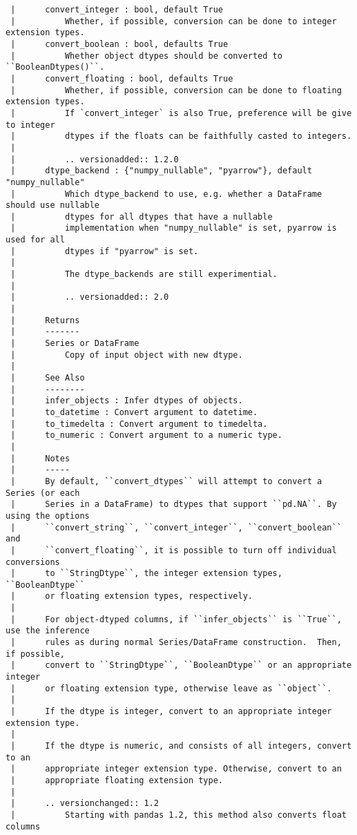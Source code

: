 \documentclass[
  letterpaper,
  DIV=11,
  numbers=noendperiod]{scrreprt}
\begin{document}
\begin{verbatim}
 |      convert_integer : bool, default True
 |          Whether, if possible, conversion can be done to integer extension types.
 |      convert_boolean : bool, defaults True
 |          Whether object dtypes should be converted to ``BooleanDtypes()``.
 |      convert_floating : bool, defaults True
 |          Whether, if possible, conversion can be done to floating extension types.
 |          If `convert_integer` is also True, preference will be give to integer
 |          dtypes if the floats can be faithfully casted to integers.
 |      
 |          .. versionadded:: 1.2.0
 |      dtype_backend : {"numpy_nullable", "pyarrow"}, default "numpy_nullable"
 |          Which dtype_backend to use, e.g. whether a DataFrame should use nullable
 |          dtypes for all dtypes that have a nullable
 |          implementation when "numpy_nullable" is set, pyarrow is used for all
 |          dtypes if "pyarrow" is set.
 |      
 |          The dtype_backends are still experimential.
 |      
 |          .. versionadded:: 2.0
 |      
 |      Returns
 |      -------
 |      Series or DataFrame
 |          Copy of input object with new dtype.
 |      
 |      See Also
 |      --------
 |      infer_objects : Infer dtypes of objects.
 |      to_datetime : Convert argument to datetime.
 |      to_timedelta : Convert argument to timedelta.
 |      to_numeric : Convert argument to a numeric type.
 |      
 |      Notes
 |      -----
 |      By default, ``convert_dtypes`` will attempt to convert a Series (or each
 |      Series in a DataFrame) to dtypes that support ``pd.NA``. By using the options
 |      ``convert_string``, ``convert_integer``, ``convert_boolean`` and
 |      ``convert_floating``, it is possible to turn off individual conversions
 |      to ``StringDtype``, the integer extension types, ``BooleanDtype``
 |      or floating extension types, respectively.
 |      
 |      For object-dtyped columns, if ``infer_objects`` is ``True``, use the inference
 |      rules as during normal Series/DataFrame construction.  Then, if possible,
 |      convert to ``StringDtype``, ``BooleanDtype`` or an appropriate integer
 |      or floating extension type, otherwise leave as ``object``.
 |      
 |      If the dtype is integer, convert to an appropriate integer extension type.
 |      
 |      If the dtype is numeric, and consists of all integers, convert to an
 |      appropriate integer extension type. Otherwise, convert to an
 |      appropriate floating extension type.
 |      
 |      .. versionchanged:: 1.2
 |          Starting with pandas 1.2, this method also converts float columns

\end{verbatim}
\end{document}
